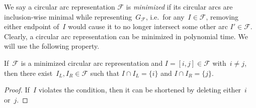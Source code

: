 \documentclass[a4paper,UKenglish,cleveref,thm-restate]{lipics-v2021}
\theoremstyle{remark}
\newcommand{\Fc}{\mathcal{F}}
\begin{document}
We say a circular arc representation $\Fc$ is \emph{minimized} if its circular arcs are inclusion-wise minimal while representing~$G_\Fc$, i.e.\ for any~$I \in \Fc$, removing either endpoint of~$I$ would cause it to no longer intersect some other arc $I' \in \Fc$.
Clearly, a circular arc representation can be minimized in polynomial time.
We will use the following property.
\begin{lemma}\label{lem:min-arc-rep}
    If~$\Fc$ is a minimized circular arc representation and $I = [i,j] \in \Fc$ with~$i \neq j$, then there exist~$I_L, I_R \in \Fc$ such that $I \cap I_L = \{i\}$ and $I \cap I_R = \{j\}$.
\end{lemma}
\begin{proof}
    If~$I$ violates the condition, then it can be shortened by deleting either~$i$ or~$j$.
\end{proof}
\end{document}

